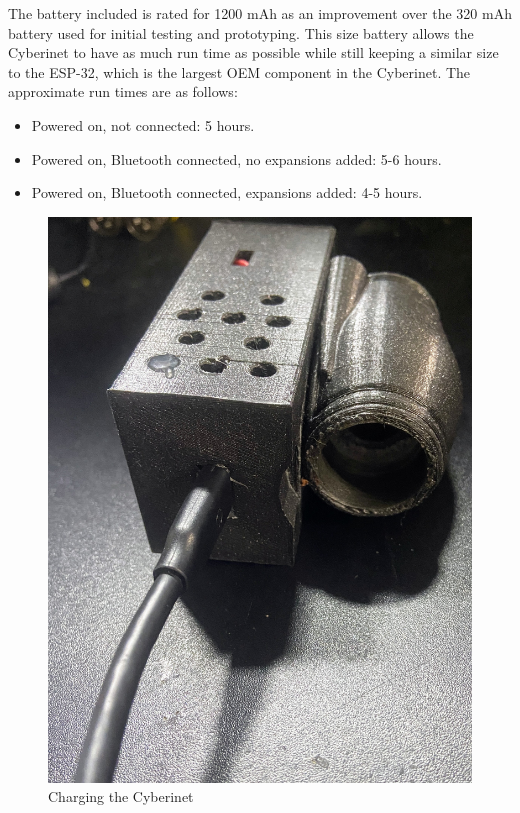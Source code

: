 The battery included is rated for 1200 mAh as an improvement over the 320 mAh battery used for initial testing and prototyping. This size battery allows the Cyberinet to have as much run time as possible while still keeping a similar size to the ESP-32, which is the largest OEM component in the Cyberinet. The approximate run times are as follows:

\begin{itemize}
    \item Powered on, not connected: 5 hours.
    \item Powered on, Bluetooth connected, no expansions added: 5-6 hours.
    \item Powered on, Bluetooth connected, expansions added: 4-5 hours.
\end{itemize}



\begin{figure}
    \centering
    \includegraphics[scale=0.08]{diagrams/IMG_2208 (1).JPG}
    \caption{Charging the Cyberinet}
    \label{fig:chargeUnit}
\end{figure}

